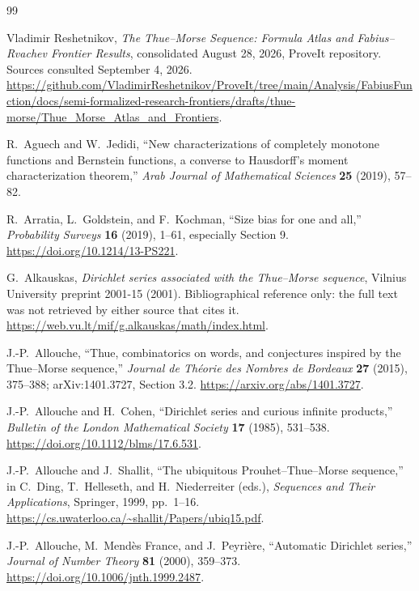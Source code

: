 \documentclass[11pt,a4paper,oneside,openany]{book}
\numberwithin{equation}{chapter}
\theoremstyle{definition}
\theoremstyle{remark}
\begin{document}
\backmatter
\begin{thebibliography}{99}

Vladimir Reshetnikov, \emph{The Thue--Morse Sequence: Formula Atlas and
Fabius--Rvachev Frontier Results}, consolidated August 28, 2026, ProveIt
repository. Sources consulted September 4, 2026.
\url{https://github.com/VladimirReshetnikov/ProveIt/tree/main/Analysis/FabiusFunction/docs/semi-formalized-research-frontiers/drafts/thue-morse/Thue_Morse_Atlas_and_Frontiers}.

R.~Aguech and W.~Jedidi, ``New characterizations of completely monotone
functions and Bernstein functions, a converse to Hausdorff's moment
characterization theorem,'' \emph{Arab Journal of Mathematical Sciences}
\textbf{25} (2019), 57--82.

R.~Arratia, L.~Goldstein, and F.~Kochman, ``Size bias for one and all,''
\emph{Probability Surveys} \textbf{16} (2019), 1--61, especially Section 9.
\url{https://doi.org/10.1214/13-PS221}.

G.~Alkauskas, \emph{Dirichlet series associated with the Thue--Morse
sequence}, Vilnius University preprint 2001-15 (2001). Bibliographical
reference only: the full text was not retrieved by either source that cites
it. \url{https://web.vu.lt/mif/g.alkauskas/math/index.html}.

J.-P.~Allouche, ``Thue, combinatorics on words, and conjectures inspired by
the Thue--Morse sequence,'' \emph{Journal de Th\'eorie des Nombres de
Bordeaux} \textbf{27} (2015), 375--388; arXiv:1401.3727, Section 3.2.
\url{https://arxiv.org/abs/1401.3727}.

J.-P.~Allouche and H.~Cohen, ``Dirichlet series and curious infinite
products,'' \emph{Bulletin of the London Mathematical Society} \textbf{17}
(1985), 531--538. \url{https://doi.org/10.1112/blms/17.6.531}.

J.-P.~Allouche and J.~Shallit, ``The ubiquitous Prouhet--Thue--Morse
sequence,'' in C.~Ding, T.~Helleseth, and H.~Niederreiter (eds.),
\emph{Sequences and Their Applications}, Springer, 1999, pp.~1--16.
\url{https://cs.uwaterloo.ca/~shallit/Papers/ubiq15.pdf}.

J.-P.~Allouche, M.~Mend\`es France, and J.~Peyri\`ere, ``Automatic
Dirichlet series,'' \emph{Journal of Number Theory} \textbf{81} (2000),
359--373. \url{https://doi.org/10.1006/jnth.1999.2487}.


\end{thebibliography}
\end{document}
